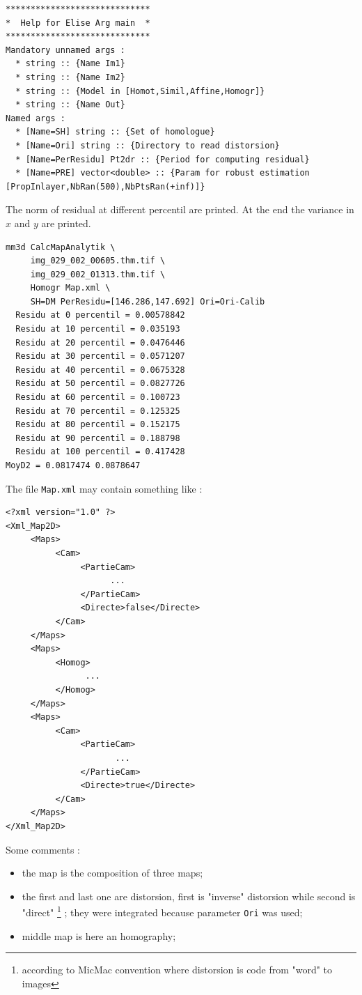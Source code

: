 \begin{verbatim}
*****************************
*  Help for Elise Arg main  *
*****************************
Mandatory unnamed args : 
  * string :: {Name Im1}
  * string :: {Name Im2}
  * string :: {Model in [Homot,Simil,Affine,Homogr]}
  * string :: {Name Out}
Named args : 
  * [Name=SH] string :: {Set of homologue}
  * [Name=Ori] string :: {Directory to read distorsion}
  * [Name=PerResidu] Pt2dr :: {Period for computing residual}
  * [Name=PRE] vector<double> :: {Param for robust estimation [PropInlayer,NbRan(500),NbPtsRan(+inf)]}
\end{verbatim}

The norm of residual at different percentil are printed. At the end the
variance in $x$ and $y$ are printed.


\begin{verbatim}
mm3d CalcMapAnalytik \
     img_029_002_00605.thm.tif \
     img_029_002_01313.thm.tif \
     Homogr Map.xml \
     SH=DM PerResidu=[146.286,147.692] Ori=Ori-Calib
  Residu at 0 percentil = 0.00578842
  Residu at 10 percentil = 0.035193
  Residu at 20 percentil = 0.0476446
  Residu at 30 percentil = 0.0571207
  Residu at 40 percentil = 0.0675328
  Residu at 50 percentil = 0.0827726
  Residu at 60 percentil = 0.100723
  Residu at 70 percentil = 0.125325
  Residu at 80 percentil = 0.152175
  Residu at 90 percentil = 0.188798
  Residu at 100 percentil = 0.417428
MoyD2 = 0.0817474 0.0878647
\end{verbatim}

The file {\tt  Map.xml} may contain something like :

{\tiny
\begin{verbatim}
<?xml version="1.0" ?>
<Xml_Map2D>
     <Maps>
          <Cam>
               <PartieCam>
                     ...
               </PartieCam>
               <Directe>false</Directe>
          </Cam>
     </Maps>
     <Maps>
          <Homog>
                ...
          </Homog>
     </Maps>
     <Maps>
          <Cam>
               <PartieCam>
                      ...
               </PartieCam>
               <Directe>true</Directe>
          </Cam>
     </Maps>
</Xml_Map2D>
\end{verbatim}
}

Some comments :

\begin{itemize}
   \item the map is the composition of three maps;

   \item the first and last one are distorsion, first is "inverse" distorsion 
         while second is "direct" \footnote{according to MicMac convention where 
         distorsion is code from "word" to images} ; they were integrated because
         parameter {\tt Ori} was used;

   \item middle map is here  an homography;
\end{itemize}

